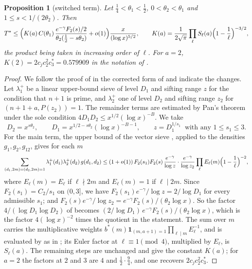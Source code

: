 \documentclass[11pt,a4paper]{amsart}
\newtheorem{proposition}[theorem]{Proposition}
\theoremstyle{remark}
\numberwithin{equation}{section}
\begin{document}
\begin{proposition}[switched term]\label{prop:switch}
Let $\frac14<\theta_1<\frac12$, $0<\theta_2<\theta_1$ and $1\le s<1/(2\theta_2)$. Then
\[
T^\ast\le\Bigl(K(a)\,C(\theta_1)\,\frac{e^{-\gamma}F_2(s)/2}{\theta_2(\frac12-s\theta_2)}+o(1)\Bigr)\frac{x}{(\log x)^{5/2}},
\qquad K(a)=\frac{1}{2\sqrt\pi}\prod_{\ell}S_\ell(a)\Bigl(1-\frac1\ell\Bigr)^{-3/2},
\]
the product being taken in increasing order of $\ell$. For $a=2$, $K(2)=2c_jc_2^2c_3^*=0.579909$ in the notation
of \cite{NXerr}.
\end{proposition}
\begin{proof}
We follow the proof of \cite[Proposition~4.2]{NX} in the corrected form of \cite[Proposition~1]{NXerr} and
indicate the changes. Let $\lambda_1^+$ be a linear upper-bound sieve of level $D_1$ and sifting range $z$ for the
condition that $n+1$ is prime, and $\lambda_2^+$ one of level $D_2$ and sifting range $z_2$ for
$(n+1+a,P(z_2))=1$. The remainder terms \cite[(4.13)--(4.16)]{NX} are estimated by Pan's theorem
\cite[Theorem~3.1]{NX} under the sole condition $4D_1D_2\le x^{1/2}(\log x)^{-B}$. We take
\[
D_2=x^{s\theta_2},\qquad D_1=x^{1/2-s\theta_2}(\log x)^{-B-1},\qquad z=D_1^{1/s_1}\ \text{ with any }1\le s_1\le3 .
\]
For the main term, the upper bound of the vector sieve \cite[Proposition~3.10]{NX}, applied to the densities
$g_1,g_2,g_{12}$, gives for each $m$
\[
\sum_{\substack{(d_1,2m)=(d_2,2m)=1}}\lambda_1^+(d_1)\lambda_2^+(d_2)\,g(d_1,d_2)\le(1+o(1))\,F_2(s_1)F_2(s)\,
\frac{e^{-\gamma}}{\log z}\cdot\frac{e^{-\gamma}}{\log z_2}\prod_{\ell}E_\ell(m)\Bigl(1-\frac1\ell\Bigr)^{-2},
\]
where $E_\ell(m)=E_\ell$ if $\ell\nmid2m$ and $E_\ell(m)=1$ if $\ell\mid 2m$. Since $F_2(s_1)=C_2/s_1$ on $(0,3]$, we
have $F_2(s_1)e^{-\gamma}/\log z=2/\log D_1$ for every admissible $s_1$; and $F_2(s)e^{-\gamma}/\log z_2=
e^{-\gamma}F_2(s)/(\theta_2\log x)$. So the factor $4/(\log D_1\log D_2)$ of \cite{NX} becomes
$(2/\log D_1)\,e^{-\gamma}F_2(s)/(\theta_2\log x)$, which is the factor $4(\log x)^{-2}$ times the quotient in the
statement. The sum over $m$ carries the multiplicative weights
$b^\ast(m)\mathbf 1_{(m,a+1)=1}\prod_{\ell\mid m}E_\ell^{-1}$, and is evaluated by \cite[Proposition~A.3]{Martin} as
in \cite{NXerr}; its Euler factor at $\ell\equiv1\pmod4$, multiplied by $E_\ell$, is $S_\ell(a)$. The remaining
steps \cite[(4.18)--(4.24)]{NX} are unchanged and give the constant $K(a)$; for $a=2$ the factors at $2$ and $3$
are $4$ and $\frac12\cdot\frac94$, and one recovers $2c_jc_2^2c_3^*$.
\end{proof}
\end{document}
